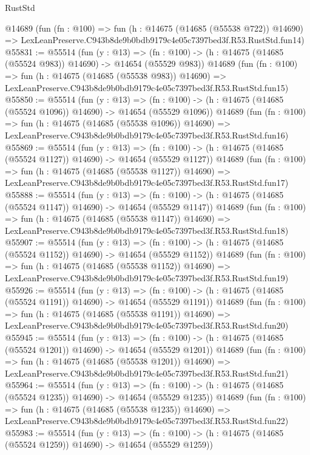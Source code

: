 \begin{lexlean}{RustStd}
\begin{coremodule}
    @14689
    (fun (fn : @100) =>
    fun (h : @14675 (@14685 (@55538 @722)) @14690) =>
    LexLeanPreserve.C943b8de9b0bdb9179c4e05c7397bed3f.R53.RustStd.fun14)
@55831 := @55514
    (fun (y : @13) =>
    (fn : @100) -> (h : @14675 (@14685 (@55524 @983)) @14690) -> @14654 (@55529 @983))
    @14689
    (fun (fn : @100) =>
    fun (h : @14675 (@14685 (@55538 @983)) @14690) =>
    LexLeanPreserve.C943b8de9b0bdb9179c4e05c7397bed3f.R53.RustStd.fun15)
@55850 := @55514
    (fun (y : @13) =>
    (fn : @100) -> (h : @14675 (@14685 (@55524 @1096)) @14690) -> @14654 (@55529 @1096))
    @14689
    (fun (fn : @100) =>
    fun (h : @14675 (@14685 (@55538 @1096)) @14690) =>
    LexLeanPreserve.C943b8de9b0bdb9179c4e05c7397bed3f.R53.RustStd.fun16)
@55869 := @55514
    (fun (y : @13) =>
    (fn : @100) -> (h : @14675 (@14685 (@55524 @1127)) @14690) -> @14654 (@55529 @1127))
    @14689
    (fun (fn : @100) =>
    fun (h : @14675 (@14685 (@55538 @1127)) @14690) =>
    LexLeanPreserve.C943b8de9b0bdb9179c4e05c7397bed3f.R53.RustStd.fun17)
@55888 := @55514
    (fun (y : @13) =>
    (fn : @100) -> (h : @14675 (@14685 (@55524 @1147)) @14690) -> @14654 (@55529 @1147))
    @14689
    (fun (fn : @100) =>
    fun (h : @14675 (@14685 (@55538 @1147)) @14690) =>
    LexLeanPreserve.C943b8de9b0bdb9179c4e05c7397bed3f.R53.RustStd.fun18)
@55907 := @55514
    (fun (y : @13) =>
    (fn : @100) -> (h : @14675 (@14685 (@55524 @1152)) @14690) -> @14654 (@55529 @1152))
    @14689
    (fun (fn : @100) =>
    fun (h : @14675 (@14685 (@55538 @1152)) @14690) =>
    LexLeanPreserve.C943b8de9b0bdb9179c4e05c7397bed3f.R53.RustStd.fun19)
@55926 := @55514
    (fun (y : @13) =>
    (fn : @100) -> (h : @14675 (@14685 (@55524 @1191)) @14690) -> @14654 (@55529 @1191))
    @14689
    (fun (fn : @100) =>
    fun (h : @14675 (@14685 (@55538 @1191)) @14690) =>
    LexLeanPreserve.C943b8de9b0bdb9179c4e05c7397bed3f.R53.RustStd.fun20)
@55945 := @55514
    (fun (y : @13) =>
    (fn : @100) -> (h : @14675 (@14685 (@55524 @1201)) @14690) -> @14654 (@55529 @1201))
    @14689
    (fun (fn : @100) =>
    fun (h : @14675 (@14685 (@55538 @1201)) @14690) =>
    LexLeanPreserve.C943b8de9b0bdb9179c4e05c7397bed3f.R53.RustStd.fun21)
@55964 := @55514
    (fun (y : @13) =>
    (fn : @100) -> (h : @14675 (@14685 (@55524 @1235)) @14690) -> @14654 (@55529 @1235))
    @14689
    (fun (fn : @100) =>
    fun (h : @14675 (@14685 (@55538 @1235)) @14690) =>
    LexLeanPreserve.C943b8de9b0bdb9179c4e05c7397bed3f.R53.RustStd.fun22)
@55983 := @55514
    (fun (y : @13) =>
    (fn : @100) -> (h : @14675 (@14685 (@55524 @1259)) @14690) -> @14654 (@55529 @1259))

\end{coremodule}
\end{lexlean}
